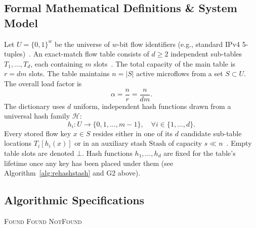 \documentclass[conference]{IEEEtran}
\let\oldtextsc\textsc
\renewcommand{\textsc}[1]{\textup{\oldtextsc{#1}}}
\begin{document}
	\subsection{Formal Mathematical Definitions \& System Model}
	Let $U = \{0, 1\}^w$ be the universe of $w$-bit flow identifiers (e.g.,
	standard IPv4 5-tuples)~\cite{pagh2004cuckoo}. An exact-match flow table
	consists of $d \ge 2$ independent sub-tables $T_1, \dots, T_d$, each
	containing $m$ slots~\cite{pagh2004cuckoo}. The total capacity of the
	main table is $r = dm$ slots. The table maintains $n = |S|$ active
	microflows from a set $S \subset U$. The overall load factor is
	\begin{equation}
		\alpha = \frac{n}{r} = \frac{n}{dm}.
	\end{equation}
	The dictionary uses $d$ uniform, independent hash functions drawn from
	a universal hash family $\mathcal{H}$:
	\begin{equation}
		h_i : U \to \{0, 1, \dots, m-1\}, \quad \forall i \in \{1, \dots, d\}.
	\end{equation}
	Every stored flow key $x \in S$ resides either in one of its $d$
	candidate sub-table locations $T_i[h_i(x)]$ or in an auxiliary stash
	$\text{Stash}$ of capacity $s \ll n$~\cite{kirsch2009stash}. Empty table
	slots are denoted $\bot$. Hash functions $h_1,\dots,h_d$ are fixed for
	the table's lifetime once any key has been placed under them (see
	Algorithm~\ref{alg:rehashstash} and G2 above).
	
	\subsection{Algorithmic Specifications}
	
	\begin{algorithm}[t]
		\caption{\textsc{Lookup}$(x)$}
		\label{alg:lookup}
		\begin{algorithmic}[1]
			\State \Return \textsc{Found}
			\EndIf
			\EndFor
			\For{each entry $e$ in \textsc{Stash}}
			\State \Return \textsc{Found}
			\EndIf
			\EndFor
			\State \Return \textsc{NotFound}
		\end{algorithmic}
	\end{algorithm}
	
\end{document}
